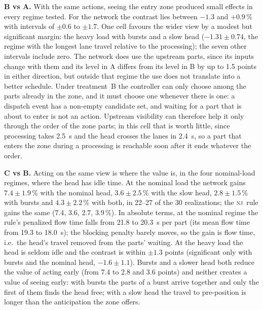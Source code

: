 \documentclass[11pt,a4paper]{article}
\newcommand{\nj}{\textsc{nj}}
\begin{document}
\textbf{B vs A.} With the same actions, seeing the entry zone produced small effects in
every regime tested. For the network the contrast lies between $-1.3$ and $+0.9$\,\%
with intervals of $\pm0.6$ to $\pm1.7$. One cell favours the wider view by a modest but
significant margin: the heavy load with bursts and a slow head ($-1.31\pm0.74$, the
regime with the longest lane travel relative to the processing); the seven other
intervals include zero. The network does use the upstream parts, since its inputs change
with them and its level in A differs from its level in B by up to 1.5 points in either
direction, but outside that regime the use does not translate into a better schedule.
Under treatment~B the controller can only choose among the parts already in the zone, and
it must choose one whenever there is one: a dispatch event has a non-empty candidate set,
and waiting for a part that is about to enter is not an action. Upstream visibility can
therefore help it only through the order of the zone parts; in this cell that is worth
little, since processing takes 2.5~s and the head crosses the lanes in 2.4~s, so a part
that enters the zone during a processing is reachable soon after it ends whatever the
order.

\textbf{C vs B.} Acting on the same view is where the value is, in the four nominal-load
regimes, where the head has idle time. At the nominal load the network gains $7.4\pm1.9$\,\% with the nominal head,
$3.6\pm2.5$\,\% with the slow head, $2.8\pm1.5$\,\% with bursts and $4.3\pm2.2$\,\% with
both, in 22--27 of the 30 realizations; the \nj\ rule gains the same ($7.4$, $3.6$, $2.7$,
$3.9$\,\%). In absolute terms, at the nominal regime the rule's penalized flow time falls
from 21.8 to 20.3~s per part (its mean flow time from 19.3 to 18.0~s); the blocking
penalty barely moves, so the gain is flow time, i.e.\ the head's travel removed from the
parts' waiting. At the heavy load the head is seldom idle and the contrast is within
$\pm1.3$ points (significant only with bursts and the nominal head, $-1.6\pm1.1$). Bursts
and a slower head both reduce the value of acting early (from 7.4 to 2.8 and 3.6 points)
and neither creates a value of seeing early: with bursts the parts of a burst arrive
together and only the first of them finds the head free; with a slow head the travel to
pre-position is longer than the anticipation the zone offers.
\end{document}
